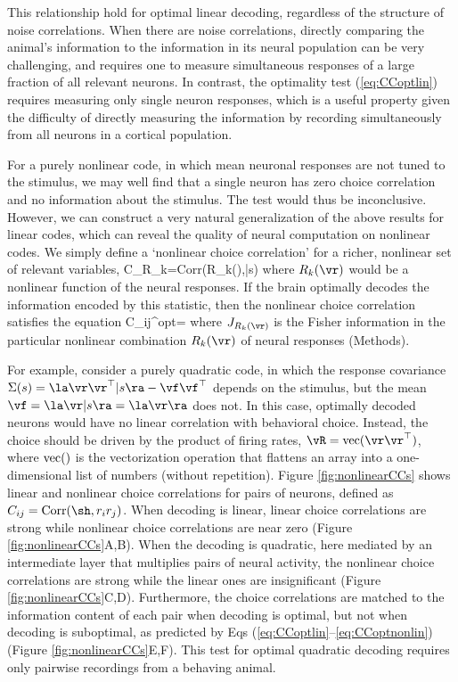 \documentclass[11pt,twocolumn]{article}
\begin{document}
This relationship hold for optimal linear decoding, regardless of the structure of noise correlations. When there are noise correlations, directly comparing the animal's information to the information in its neural population can be very challenging, and requires one to measure simultaneous responses of a large fraction of all relevant neurons. In contrast, the optimality test (\ref{eq:CCoptlin}) requires measuring only single neuron responses, which is a useful property given the difficulty of directly measuring the information by recording simultaneously from all neurons in a cortical population.

For a purely nonlinear code, in which mean neuronal responses are not tuned to the stimulus, we may well find that a single neuron has zero choice correlation and no information about the stimulus. The test would thus be inconclusive. However, we can construct a very natural generalization of the above results for linear codes, which can reveal the quality of neural computation on nonlinear codes. We simply define a `nonlinear choice correlation' for a richer, nonlinear set of relevant variables,
\be
C_{R_k}={\rm Corr}(R_k(\vr),\sh|s)
\label{eq:CCdef_nonlin}
\ee
where $R_k(\vr)$ would be a nonlinear function of the neural responses. If the brain optimally decodes the information encoded by this statistic, then the nonlinear choice correlation satisfies the equation
\be
C_{ij}^{\rm opt}=
\label{eq:CCoptnonlin}
\ee
where $J_{R_k(\vr)}$ is the Fisher information in the particular nonlinear combination $R_k(\vr)$ of neural responses (Methods).

For example, consider a purely quadratic code, in which the response covariance $\Sigma(s)=\la\vr\vr^\top|s\ra-\vf\vf^\top$ depends on the stimulus, but the mean $\vf=\la\vr|s\ra=\la\vr\ra$ does not. In this case, optimally decoded neurons would have no linear correlation with behavioral choice. Instead, the choice should be driven by the product of firing rates, $\vR={\rm vec}(\vr\vr^\top)$, where $\rm vec()$ is the vectorization operation that flattens an array into a one-dimensional list of numbers (without repetition). Figure \ref{fig:nonlinearCCs} shows linear and nonlinear choice correlations for pairs of neurons, defined as $C_{ij}={\rm Corr}(\sh,r_ir_j)$. When decoding is linear, linear choice correlations are strong while nonlinear choice correlations are near zero (Figure \ref{fig:nonlinearCCs}A,B). When the decoding is quadratic, here mediated by an intermediate layer that multiplies pairs of neural activity, the nonlinear choice correlations are strong while the linear ones are insignificant (Figure \ref{fig:nonlinearCCs}C,D). Furthermore, the choice correlations are matched to the information content of each pair when decoding is optimal, but not when decoding is suboptimal, as predicted by Eqs (\ref{eq:CCoptlin}--\ref{eq:CCoptnonlin}) (Figure \ref{fig:nonlinearCCs}E,F). This test for optimal quadratic decoding requires only pairwise recordings from a behaving animal.
\end{document}
